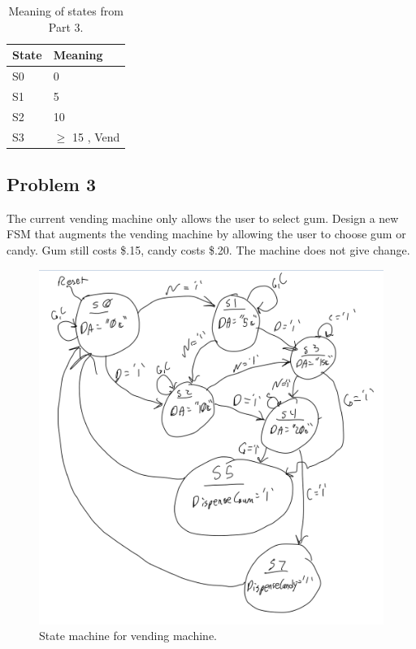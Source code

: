 \documentclass[11pt]{article}
\begin{document}
\begin{table}[H]
\begin{center}
\begin{tabular}{| l | l |}
	\hline
	State & Meaning \\ \hline
	S0 & 0 \textcent \\ \hline
	S1 & 5 \textcent \\ \hline
	S2 & 10 \textcent \\ \hline
	S3 &$\geq$ 15 \textcent , Vend \\ \hline
\end{tabular}
\caption{\label{tab:Part3States}Meaning of states from Part 3.}
\end{center}
\end{table}

\subsection{Problem 3}
The current vending machine only allows the user to select gum. Design a new FSM that augments the vending machine by allowing the user to choose gum or candy. Gum still costs \$.15, candy costs \$.20. The machine does not give change.


\begin{figure}[H]
\begin{center}
	\includegraphics[width=\textwidth]{./img10_1.png}
	\caption{\label{fig:state_machine}State machine for vending machine.}
\end{center}
\end{figure}
\end{document}
